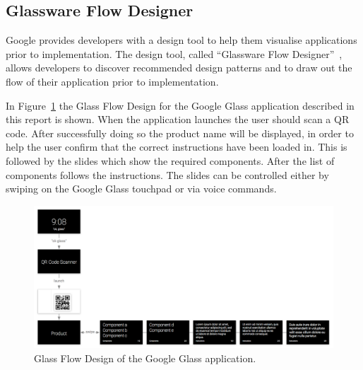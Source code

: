\subsection{Glassware Flow Designer}
Google provides developers with a design tool to help them visualise applications prior to implementation. The design tool, called ``Glassware Flow Designer''~\cite{glasswareFlowDesigner}, allows developers to discover recommended design patterns and to draw out the flow of their application prior to implementation.

In Figure~\ref{glassFlowDesign} the Glass Flow Design for the Google Glass application described in this report is shown. When the application launches the user should scan a QR code. After successfully doing so the product name will be displayed, in order to help the user confirm that the correct instructions have been loaded in. This is followed by the slides which show the required components. After the list of components follows the instructions. The slides can be controlled either by swiping on the Google Glass touchpad or via voice commands.

	\begin{figure}[ht!]
		\centering
		\includegraphics[width=150mm]{images/glaswareFlowDesignerScreenshot}
		\caption{Glass Flow Design of the Google Glass application.}
		\label{glassFlowDesign}
	\end{figure}